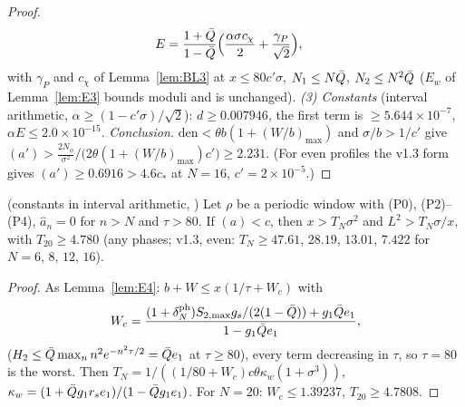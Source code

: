 \begin{proof}
\begin{equation*}
\begin{aligned}
E&=\frac{1+\bar Q}{1-\bar Q}\Big(\frac{\alpha\sigma c_\chi}2+\frac{\gamma_P}{\sqrt2}\Big),
\end{aligned}
\end{equation*}
with $\gamma_P$ and $c_\chi$ of Lemma~\ref{lem:BL3} at $x\le80c'\sigma$, $N_1\le N\bar Q$, $N_2\le N^2\bar Q$ ($E_w$ of Lemma~\ref{lem:E3} bounds moduli and is unchanged).
\emph{(3) Constants} (interval arithmetic, $\alpha\ge(1-c'\sigma)/\sqrt2$): $d\ge0.007946$, the first term is $\ge5.644\times10^{-7}$, $\alpha E\le2.0\times10^{-15}$.
\emph{Conclusion.} $\mathrm{den}<\theta b(1+(W/b)_{\max})$ and $\sigma/b>1/c'$ give $(a')>\frac{2N_\phi}{\sigma^2}\big/\big(2\theta(1+(W/b)_{\max})c'\big)\ge2.231$.
(For even profiles the v1.3 form gives $(a')\ge0.6916>4.6c_*$ at $N=16$, $c'=2\times10^{-5}$.)
\end{proof}

\begin{lemma} \proofst{} (constants in interval arithmetic, )
\label{lem:F5}
Let $\rho$ be a periodic window with (P0), (P2)--(P4), $\hat a_n=0$ for $n>N$ and $\tau>80$. If $(a)<c$, then $x>T_N\sigma^2$ and $L^2>T_N\sigma/x$, with
$T_{20}\ge4.780$ (any phases; v1.3, even: $T_N\ge47.61$, $28.19$, $13.01$, $7.422$ for $N=6$, $8$, $12$, $16$).
\end{lemma}
\begin{proof}
As Lemma~\ref{lem:E4}: $b+W\le x(1/\tau+W_c)$ with
\begin{equation*}
W_c=\frac{(1+\delta_N^{\mathrm{ph}})S_{2,\max}g_s/(2(1-\bar Q))+g_1\bar Q e_1}{1-g_1\bar Q e_1},
\end{equation*}
($H_2\le\bar Q\max_nn^2e^{-n^2\tau/2}=\bar Q e_1$ at $\tau\ge80$), every term decreasing in $\tau$, so $\tau=80$ is the worst. Then
$T_N=1/((1/80+W_c)c\theta\kappa_w(1+\sigma^3))$, $\kappa_w=(1+\bar Q g_1r_se_1)/(1-\bar Q g_1e_1)$. For $N=20$: $W_c\le1.39237$, $T_{20}\ge4.7808$.
\end{proof}

